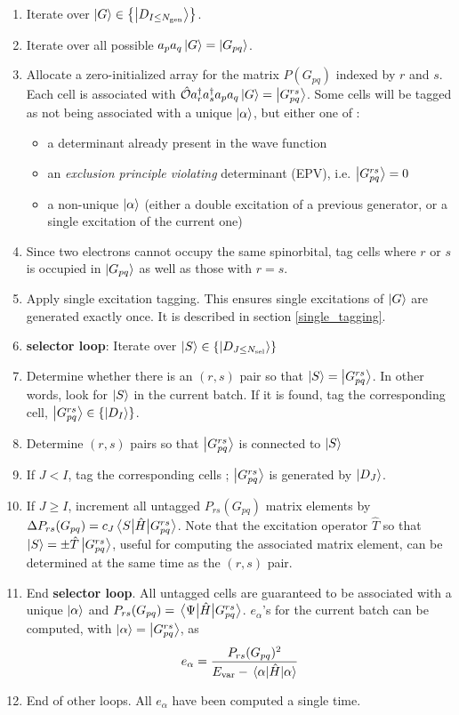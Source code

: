 \documentclass[./thesis.tex]{subfiles}
\begin{document}
\begin{enumerate}
\item
Iterate over $\ket {G} \in \left \{ \ket{D_{I \leq {N_\text{gen}}}} \right \}$.
\item
Iterate over all possible $a_p a_q \ket G = \ket {G_{pq}}$.
\item
Allocate a zero-initialized array for the matrix $P(G_{pq})$ indexed by $r$ and $s$. Each cell is associated with ${\hat{\mathcal{O}}} a^\dagger_r a^\dagger_s a_p a_q  \ket G = \ket{G^{rs}_{pq}}$. Some cells will be tagged as not being associated with a unique $\ket \alpha$, but either one of :
\begin{itemize}
\item
a determinant already present in the wave function
\item
an \emph{exclusion principle violating} determinant (EPV), i.e. $\ket{G^{rs}_{pq}} = 0$
\item
a non-unique $\ket \alpha$ (either a double excitation of a previous generator, or a single excitation of the current one)
\end{itemize}

\item
Since two electrons cannot occupy the same spinorbital, tag cells where $r$ or $s$ is occupied in $\ket {G_{pq}}$ as well as those with $r=s$.
\item
Apply single excitation tagging. This ensures single excitations of $\ket G$ are generated exactly once. It is described in section \ref{single_tagging}.
\item
\textbf{selector loop}: Iterate over $\ket {S} \in \left \{ \ket{D_{J \le {N_\text{sel}}}} \right \}$
\item
Determine whether there is an $(r,s)$ pair so that $\ket S = \ket {G_{pq}^{rs}}$. In other words, look for $\ket S$ in the current batch. If it is found, tag the corresponding cell, $\ket{G^{rs}_{pq}} \in \{\ket{D_I}\}$.
\item
Determine $(r,s)$ pairs so that $\ket {G_{pq}^{rs}}$ is connected to $\ket S$
\item
If $J<I$, tag the corresponding cells ; $\ket{G^{rs}_{pq}}$ is generated by $\ket{D_J}$.
\item
If $J \geq I$, increment all untagged $P_{rs}(G_{pq})$ matrix elements by $\Delta P_{rs}(G_{pq}) = c_J \mel{S}{\hat{H}}{G^{rs}_{pq}}$. Note that the excitation operator $\hat{T}$ so that $\ket S= \pm \hat{T} \ket{G^{rs}_{pq}}$, useful for computing the associated matrix element, can be determined at the same time as the $(r,s)$ pair.
\item
End \textbf{selector loop}. All untagged cells are guaranteed to be associated with a unique $\ket \alpha$ and $P_{rs}(G_{pq}) = \mel{\Psi}{\hat{H}}{G^{rs}_{pq}}$. $e_\alpha$'s for the current batch can be computed, with ${\ket{\alpha}} = \ket {G_{pq}^{rs}}$, as
\begin{equation}
e_\alpha = \frac{P_{rs}(G_{pq})^2}{E_\text{var}-\mel{\alpha}{\hat{H}}{\alpha}}
\end{equation}
\item
End of other loops. All $e_\alpha$ have been computed a single time.

\end{enumerate}
\end{document}
